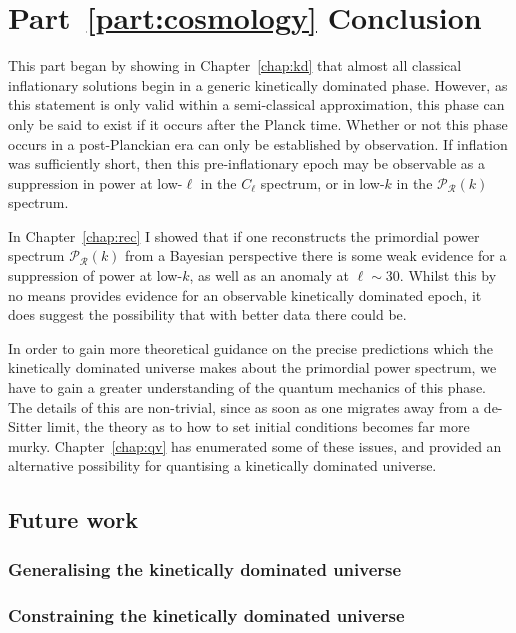 \chapter*{Part~\ref{part:cosmology} Conclusion}

This part began by showing in Chapter~\ref{chap:kd} that almost all classical inflationary solutions begin in a generic kinetically dominated phase. However, as this statement is only valid within a semi-classical approximation, this phase can only be said to exist if it occurs after the Planck time.
Whether or not this phase occurs in a post-Planckian era can only be established by observation. If inflation was sufficiently short, then this pre-inflationary epoch may be observable as a suppression in power at low-$\ell$ in the $C_\ell$ spectrum, or in low-$k$ in the $\mathcal{P}_\mathcal{R}(k)$ spectrum. 

In Chapter~\ref{chap:rec} I showed that if one reconstructs the primordial power spectrum $\mathcal{P}_\mathcal{R}(k)$ from a Bayesian perspective there is some weak evidence for a suppression of power at low-$k$, as well as an anomaly at $\ell\sim30$. Whilst this by no means provides evidence for an observable kinetically dominated epoch, it does suggest the possibility that with better data there could be.

In order to gain more theoretical guidance on the precise predictions which the kinetically dominated universe makes about the primordial power spectrum, we have to gain a greater understanding of the quantum mechanics of this phase. The details of this are non-trivial, since as soon as one migrates away from a de-Sitter limit, the theory as to how to set initial conditions becomes far more murky. Chapter~\ref{chap:qv} has enumerated some of these issues, and provided an alternative possibility for quantising a kinetically dominated universe.

\section*{Future work}
\subsection{Generalising the kinetically dominated universe}


\subsection{Constraining the kinetically dominated universe}

